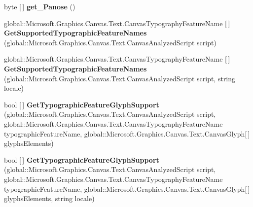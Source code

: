 \begin{DoxyCompactItemize}
\item 
\mbox{\label{class_microsoft_1_1_graphics_1_1_canvas_1_1_text_1_1_canvas_font_face_aabf184fee746021f37afff4cd11861b0}} 
byte \mbox{[}$\,$\mbox{]} {\bfseries get\+\_\+\+Panose} ()
\item 
\mbox{\label{class_microsoft_1_1_graphics_1_1_canvas_1_1_text_1_1_canvas_font_face_adcab0286e27de35e3d924abfbadc35e2}} 
global\+::\+Microsoft.\+Graphics.\+Canvas.\+Text.\+Canvas\+Typography\+Feature\+Name \mbox{[}$\,$\mbox{]} {\bfseries Get\+Supported\+Typographic\+Feature\+Names} (global\+::\+Microsoft.\+Graphics.\+Canvas.\+Text.\+Canvas\+Analyzed\+Script script)
\item 
\mbox{\label{class_microsoft_1_1_graphics_1_1_canvas_1_1_text_1_1_canvas_font_face_ad0a7590dc7c0440edef17858e30d976b}} 
global\+::\+Microsoft.\+Graphics.\+Canvas.\+Text.\+Canvas\+Typography\+Feature\+Name \mbox{[}$\,$\mbox{]} {\bfseries Get\+Supported\+Typographic\+Feature\+Names} (global\+::\+Microsoft.\+Graphics.\+Canvas.\+Text.\+Canvas\+Analyzed\+Script script, string locale)
\item 
\mbox{\label{class_microsoft_1_1_graphics_1_1_canvas_1_1_text_1_1_canvas_font_face_a6b78ca90d54be6ec99a39ea2e3950498}} 
bool \mbox{[}$\,$\mbox{]} {\bfseries Get\+Typographic\+Feature\+Glyph\+Support} (global\+::\+Microsoft.\+Graphics.\+Canvas.\+Text.\+Canvas\+Analyzed\+Script script, global\+::\+Microsoft.\+Graphics.\+Canvas.\+Text.\+Canvas\+Typography\+Feature\+Name typographic\+Feature\+Name, global\+::\+Microsoft.\+Graphics.\+Canvas.\+Text.\+Canvas\+Glyph\mbox{[}$\,$\mbox{]} glyphs\+Elements)
\item 
\mbox{\label{class_microsoft_1_1_graphics_1_1_canvas_1_1_text_1_1_canvas_font_face_ae0d5c7ee944b1f25cd4fb4678a0b2f3f}} 
bool \mbox{[}$\,$\mbox{]} {\bfseries Get\+Typographic\+Feature\+Glyph\+Support} (global\+::\+Microsoft.\+Graphics.\+Canvas.\+Text.\+Canvas\+Analyzed\+Script script, global\+::\+Microsoft.\+Graphics.\+Canvas.\+Text.\+Canvas\+Typography\+Feature\+Name typographic\+Feature\+Name, global\+::\+Microsoft.\+Graphics.\+Canvas.\+Text.\+Canvas\+Glyph\mbox{[}$\,$\mbox{]} glyphs\+Elements, string locale)

\end{DoxyCompactItemize}

